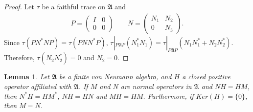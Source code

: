 \documentclass[a4paper,10pt]{amsart}
\newtheorem{lemma}{Lemma}[section]
\newcommand{\AAA}{\mathfrak A}
\begin{document}
\begin{proof}
   Let $\tau$ be a faithful trace on $\AAA$ and  
   \begin{align*}
      P = \begin{pmatrix}
          I & 0\\
          0 & 0
      \end{pmatrix} 
      \qquad 
      N = \begin{pmatrix}
          N_1 & N_2 \\
          0 & N_3
      \end{pmatrix}. 
   \end{align*}
   Since $\tau(PN^{*}NP) = \tau(PNN^{*}P)$, 
   $\tau|_{P\AAA P}(N_{1}^{*}N_1) = \tau|_{P\AAA P}(N_{1}N_{1}^{*} +
   N_2 N_{2}^{*})$. Therefore, $\tau(N_2 N_{2}^{*}) = 0$ and $
   N_2 = 0$.
\end{proof}


\begin{lemma} \label{flam2}
    Let $\AAA$ be a finite von Neumann algebra,
    and $H$ a closed positive operator affiliated with $\AAA$. 
    If $M$ and $N$ are normal operators in $\AAA$ and $NH = HM$,
    then $N^{*}H = HM^{*}$, $NH= HN$ and $MH=HM$. 
    Furthermore, if $Ker(H) = \{0\}$, then
    $M=N$.
\end{lemma}
\end{document}
